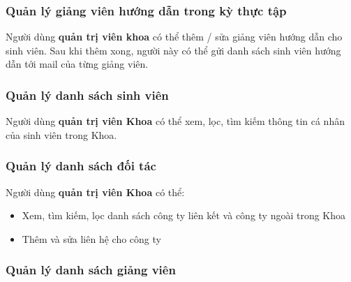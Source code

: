 \documentclass[./../main.tex]{subfiles}
\begin{document}
\hypertarget{quux1ea3n-luxfd-giux1ea3ng-viuxean-hux1b0ux1edbng-dux1eabn-trong-kux1ef3-thux1ef1c-tux1eadp}{%
	\subsubsection{Quản lý giảng viên hướng dẫn trong kỳ thực
		tập}\label{quux1ea3n-luxfd-giux1ea3ng-viuxean-hux1b0ux1edbng-dux1eabn-trong-kux1ef3-thux1ef1c-tux1eadp}}
  
Người dùng \textbf{quản trị viên khoa} có thể thêm / sửa giảng viên
hướng dẫn cho sinh viên. Sau khi thêm xong, người này có thể gửi danh
sách sinh viên hướng dẫn tới mail của từng giảng viên.
  
\hypertarget{quux1ea3n-luxfd-danh-suxe1ch-sinh-viuxean}{%
	\subsubsection{Quản lý danh sách sinh
		viên}\label{quux1ea3n-luxfd-danh-suxe1ch-sinh-viuxean}}
  
Người dùng \textbf{quản trị viên Khoa} có thể xem, lọc, tìm kiếm thông
tin cá nhân của sinh viên trong Khoa.
  
\hypertarget{quux1ea3n-luxfd-danh-suxe1ch-ux111ux1ed1i-tuxe1c}{%
	\subsubsection{Quản lý danh sách đối
		tác}\label{quux1ea3n-luxfd-danh-suxe1ch-ux111ux1ed1i-tuxe1c}}
  
Người dùng \textbf{quản trị viên Khoa} có thể:
  
\begin{itemize}
	\item
	      
	      	Xem, tìm kiếm, lọc danh sách công ty liên kết và công ty ngoài trong
	      	Khoa
	      
	\item
	      
	      	Thêm và sửa liên hệ cho công ty
	      
\end{itemize}
  
\hypertarget{quux1ea3n-luxfd-danh-suxe1ch-giux1ea3ng-viuxean}{%
	\subsubsection{Quản lý danh sách giảng
		viên}\label{quux1ea3n-luxfd-danh-suxe1ch-giux1ea3ng-viuxean}}
  
\end{document}
